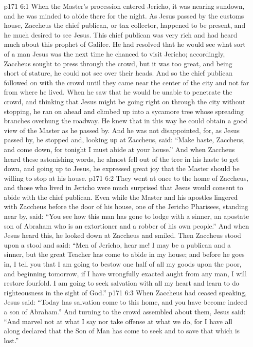 \vs p171 6:1 When the Master’s procession entered Jericho, it was nearing sundown, and he was minded to abide there for the night. As Jesus passed by the customs house, Zaccheus the chief publican, or tax collector, happened to be present, and he much desired to see Jesus. This chief publican was very rich and had heard much about this prophet of Galilee. He had resolved that he would see what sort of a man Jesus was the next time he chanced to visit Jericho; accordingly, Zaccheus sought to press through the crowd, but it was too great, and being short of stature, he could not see over their heads. And so the chief publican followed on with the crowd until they came near the center of the city and not far from where he lived. When he saw that he would be unable to penetrate the crowd, and thinking that Jesus might be going right on through the city without stopping, he ran on ahead and climbed up into a sycamore tree whose spreading branches overhung the roadway. He knew that in this way he could obtain a good view of the Master as he passed by. And he was not disappointed, for, as Jesus passed by, he stopped and, looking up at Zaccheus, said: \textcolor{ubdarkred}{“Make haste, Zaccheus, and come down, for tonight I must abide at your house.”} And when Zaccheus heard these astonishing words, he almost fell out of the tree in his haste to get down, and going up to Jesus, he expressed great joy that the Master should be willing to stop at his house.
\vs p171 6:2 They went at once to the home of Zaccheus, and those who lived in Jericho were much surprised that Jesus would consent to abide with the chief publican. Even while the Master and his apostles lingered with Zaccheus before the door of his house, one of the Jericho Pharisees, standing near by, said: “You see how this man has gone to lodge with a sinner, an apostate son of Abraham who is an extortioner and a robber of his own people.” And when Jesus heard this, he looked down at Zaccheus and smiled. Then Zaccheus stood upon a stool and said: “Men of Jericho, hear me! I may be a publican and a sinner, but the great Teacher has come to abide in my house; and before he goes in, I tell you that I am going to bestow one half of all my goods upon the poor, and beginning tomorrow, if I have wrongfully exacted aught from any man, I will restore fourfold. I am going to seek salvation with all my heart and learn to do righteousness in the sight of God.”
\vs p171 6:3 When Zaccheus had ceased speaking, Jesus said: \textcolor{ubdarkred}{“Today has salvation come to this home, and you have become indeed a son of Abraham.”} And turning to the crowd assembled about them, Jesus said: \textcolor{ubdarkred}{“And marvel not at what I say nor take offense at what we do, for I have all along declared that the Son of Man has come to seek and to save that which is lost.”}
